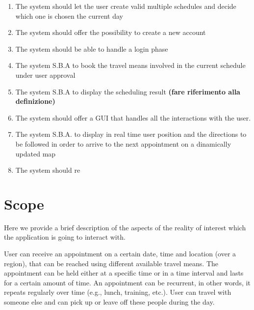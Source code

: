 \begin{enumerate}
\item The system should let the user create valid multiple schedules and decide which one is chosen the current day 
 \label{goal:G8}

\item The system should offer the possibility to create a new account \label{goal:G3}

\item The system should be able to handle a login phase \label{goal:G9}

\item The system S.B.A to book the travel means involved in the current schedule under user approval \label{goal:G4} 

\item The system S.B.A to display the scheduling result \textbf{(fare riferimento alla definizione)} \label{goal:G5}

\item The system should offer a GUI that handles all the interactions with the user. \label{goal:G6}

\item The system S.B.A. to display in real time user position and the directions to be followed in order to arrive to the next appointment on a dinamically updated map \label{G7}

\item The system should re

\end{enumerate}


\section{Scope}
Here we provide a brief description of the aspects of the reality of interest which the application is going to interact with.

User can receive an appointment on a certain date, time and location (over a region), that can be reached using different available travel means. The appointment can be held either at a specific time or in a time interval and lasts for a certain amount of time. An appointment can be recurrent, in other words, it repeats regularly over time (e.g., lunch, training, etc.). User can travel with someone else and can pick up or leave off these people during the day.

